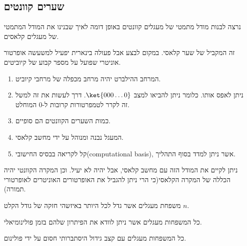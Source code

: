\documentclass{tstextbook}
\begin{document}
\subsection{שערים קוונטים}

נרצה לבנות מודל מתמטי של מעגלים קוונטים באופן דומה לאיך שבנינו את המודל המתמטי של מעגלים קלאסים.

\begin{proposition}
זה המקביל של שער קלאסי. במקום לבצע אבל פעולה בינארית יפעיל למשעשה אופרטור אוניטרי שפועל על מספר קבוע של קיוביטים. 

\end{proposition}
\begin{definition}
  \begin{enumerate}
    \item המרחב ההילברט יהיה מרחב מכפלה של מרחבי קיוביט. 


    \item ניתן לאפס אותו. כלומר ניתן להביאו למצב \(\ket{000\dots 0}\). דרך לעשות את זה למשל זה לקרר לטמפרטורות קרובות ל-0 המוחלט. 


    \item כמות השערים הקוונטים הם סופיים. 


    \item המעגל נבנה ומנוהל על ידי מחשב קלאסי. 


    \item קל לקריאה בבסיס החישובי(computational basis), אשר ניתן למדד בסוף התהליך. 


  \end{enumerate}
\end{definition}
\begin{remark}
ניתן לקיים את המודל הזה עם מחשב קלאסי, אבל יהיה לא יעיל. וכן המקרה הקוונטי יהיה הכללה של המקרה הקלאסי(כי הרי ניתן להגביל את האופרטורים האוניטרים לאופרטורי תמורה).

\end{remark}
\begin{definition}[מחלקת P]
משפחת מעגלים אשר גדל לכל היותר באיזשהי חזקה של גודל הקלט \(n\).

\end{definition}
\begin{definition}[מחלקת NP]
כל המשפחות מעגלים אשר ניתן לוודא את הפיתרון שלהם בזמן פולינומיאלי.

\end{definition}
\begin{definition}
כל המשפחות מעגלים עם קצב גידול היסתברותי חסום על ידי פולינום.

\end{definition}
\end{document}

